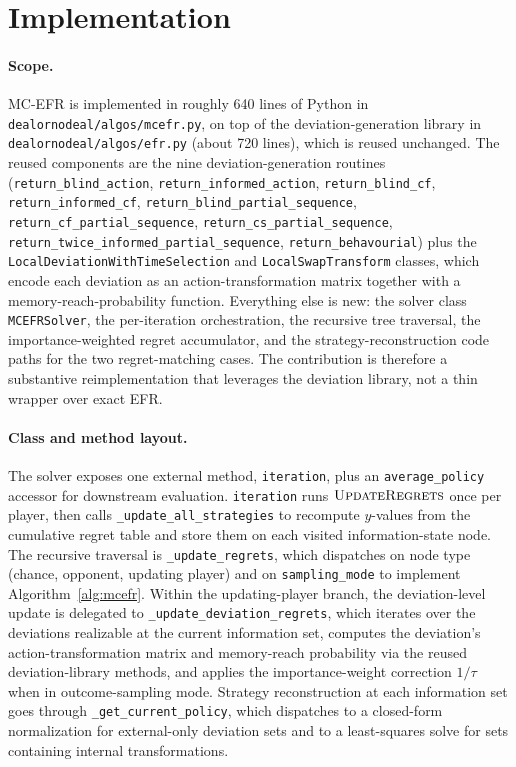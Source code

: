 \documentclass[11pt]{article}
\begin{document}
\section{Implementation}
\label{sec:mcefr_impl}

\paragraph{Scope.} MC-EFR is implemented in roughly 640 lines of Python in \texttt{dealornodeal/algos/mcefr.py}, on top of the deviation-generation library in \texttt{dealornodeal/algos/efr.py} (about 720 lines), which is reused unchanged. The reused components are the nine deviation-generation routines (\texttt{return\_blind\_action}, \texttt{return\_informed\_action}, \texttt{return\_blind\_cf}, \texttt{return\_informed\_cf}, \texttt{return\_blind\_partial\_sequence}, \texttt{return\_cf\_partial\_sequence}, \texttt{return\_cs\_partial\_sequence}, \texttt{return\_twice\_informed\_partial\_sequence}, \texttt{return\_behavourial}) plus the \texttt{LocalDeviationWithTimeSelection} and \texttt{LocalSwapTransform} classes, which encode each deviation as an action-transformation matrix together with a memory-reach-probability function. Everything else is new: the solver class \texttt{MCEFRSolver}, the per-iteration orchestration, the recursive tree traversal, the importance-weighted regret accumulator, and the strategy-reconstruction code paths for the two regret-matching cases. The contribution is therefore a substantive reimplementation that leverages the deviation library, not a thin wrapper over exact EFR.

\paragraph{Class and method layout.} The solver exposes one external method, \texttt{iteration}, plus an \texttt{average\_policy} accessor for downstream evaluation. \texttt{iteration} runs $\textsc{UpdateRegrets}$ once per player, then calls \texttt{\_update\_all\_strategies} to recompute $y$-values from the cumulative regret table and store them on each visited information-state node. The recursive traversal is \texttt{\_update\_regrets}, which dispatches on node type (chance, opponent, updating player) and on \texttt{sampling\_mode} to implement Algorithm~\ref{alg:mcefr}. Within the updating-player branch, the deviation-level update is delegated to \texttt{\_update\_deviation\_regrets}, which iterates over the deviations realizable at the current information set, computes the deviation's action-transformation matrix and memory-reach probability via the reused deviation-library methods, and applies the importance-weight correction $1/\tau$ when in outcome-sampling mode. Strategy reconstruction at each information set goes through \texttt{\_get\_current\_policy}, which dispatches to a closed-form normalization for external-only deviation sets and to a least-squares solve for sets containing internal transformations.
\end{document}
